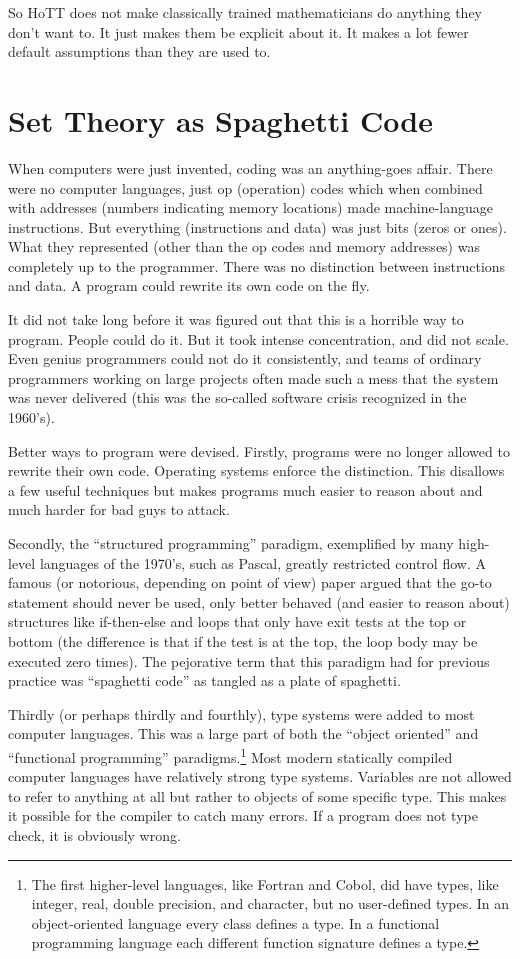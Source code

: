 \documentclass[11pt]{article}
\begin{document}
So HoTT does not make classically trained mathematicians do anything they
don't want to.  It just makes them be explicit about it.
It makes a lot fewer default assumptions than they are used to.

\section{Set Theory as Spaghetti Code}

When computers were just invented, coding was an anything-goes affair.
There were no computer languages, just op (operation) codes which when
combined with addresses (numbers indicating memory locations)
made machine-language
instructions.  But everything (instructions and data) was just bits (zeros
or ones).  What they represented (other than the op codes and memory addresses)
was completely up to the programmer.  There was no distinction between
instructions and data.  A program could rewrite its own code on the fly.

It did not take long before it was figured out that this is a horrible way
to program.  People could do it.  But it took intense concentration, and
did not scale.  Even genius programmers could not do it consistently, and
teams of ordinary programmers working on large projects often made such
a mess that the system was never delivered (this was the so-called
software crisis recognized in the 1960's).

Better ways to program were devised.  Firstly, programs were no longer allowed
to rewrite their own code.  Operating systems enforce the distinction.
This disallows a few useful techniques but makes programs much easier to
reason about and much harder for bad guys to attack.

Secondly, the ``structured programming'' paradigm, exemplified by many
high-level languages of the 1970's, such as Pascal, greatly restricted
control flow.  A famous (or notorious, depending on point of view) paper
\citep{go-to-harmful}
argued that the go-to statement should never be used, only better behaved
(and easier to reason about) structures like if-then-else and loops that
only have exit tests at the top or bottom (the difference is that if the
test is at the top, the loop body may be executed zero times).
The pejorative term that this paradigm had for previous practice was
``spaghetti code'' as tangled as a plate of spaghetti.

Thirdly (or perhaps thirdly and fourthly), type systems were added to most
computer languages.  This was a large part of both the ``object oriented''
and ``functional programming'' paradigms.\footnote{The first higher-level
languages, like Fortran and Cobol, did have types,
like integer, real, double precision, and character,
but no user-defined types.  In an object-oriented language every class defines
a type.  In a functional programming language each different function
signature defines a type.}
Most modern statically compiled
computer languages have relatively strong type systems.  Variables are
not allowed to refer to anything at all
but rather to objects of some specific type.
This makes it possible for the compiler to catch many errors.  If a program
does not type check, it is obviously wrong.
\end{document}
